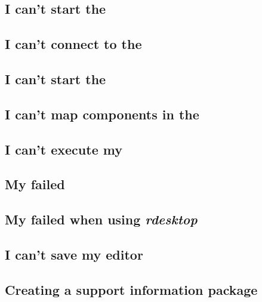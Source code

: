



\subsection{I can't start the \gdagent}
\label{troublestartserver}


\subsection{I can't connect to the \gdagent}
\label{troubleconnectserver}


\subsection{I can't start the \gdaut{}}
\label{troublestartaut}


\subsection{I can't map components in the \gdomm}
\label{troubleobjectmapping}


\subsection{I can't execute my \gdsuite{}}
\label{troubleexecute}


\subsection{My \gdsuite{} failed}
\label{troublefailed}


\subsection{My \gdsuite{} failed when using \emph{rdesktop}}
\label{troublerdesktop}


\subsection{I can't save my editor}
\label{troublelocked}


\subsection{Creating a support information package}


